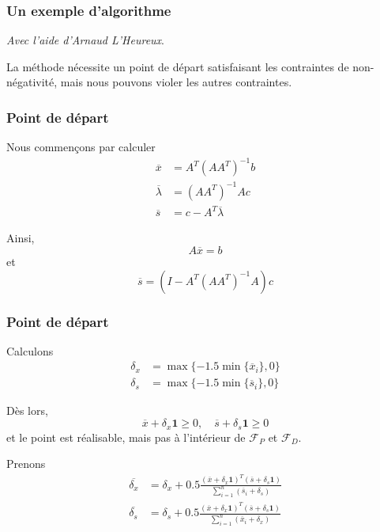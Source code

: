 \documentclass[usepdftitle=false, aspectratio=169]{beamer}
\def\bone{\boldsymbol{1}}
\begin{document}
\begin{frame}
\frametitle{Un exemple d'algorithme}


\mbox{}

\textit{Avec l'aide d'Arnaud L'Heureux}.

\mbox{}

La méthode nécessite un point de départ satisfaisant les contraintes de non-négativité, mais nous pouvons violer les autres contraintes.
	
\end{frame}

\begin{frame}
\frametitle{Point de départ}

Nous commençons par calculer
\begin{align*}
\overline{x} &= A^{T}(AA^{T})^{-1}b \\
\overline{\lambda} &= (AA^{T})^{-1}Ac \\
\overline{s} &= c - A^T\overline{\lambda}
\end{align*}

Ainsi,
$$
A\overline{x} = b
$$
et
$$
\overline{s} = (I-A^T(AA^{T})^{-1}A)c
$$

	
\end{frame}

\begin{frame}
\frametitle{Point de départ}

Calculons
\begin{align*}
\delta_x &= \max \{-1.5\min\{\overline{x}_i\}, 0 \} \\
\delta_s &= \max \{ -1.5\min\{\overline{s}_i\}, 0 \}
\end{align*}

Dès lors,
$$
	\overline{x} + \delta_x \bone \geq 0, \quad \overline{s} + \delta_s \bone \geq 0
$$
et le point est réalisable, mais pas à l'intérieur de $\mathcal{F}_P$ et $\mathcal{F}_D$.

Prenons
\begin{align*}
\overline{\delta_x} &= \delta_x + 0.5 \frac{(\overline{x}+\delta_x\bone)^T(\overline{s}+\delta_s\bone)}{\sum_{i=1}^n(\overline{s}_i+\delta_s)} \\
\overline{\delta_s} &= \delta_s + 0.5 \frac{(\overline{x}+\delta_x\bone)^T(\overline{s}+\delta_s\bone)}{\sum_{i=1}^n(\overline{x}_i+\delta_x)}
\end{align*}

\end{frame}
\end{document}
